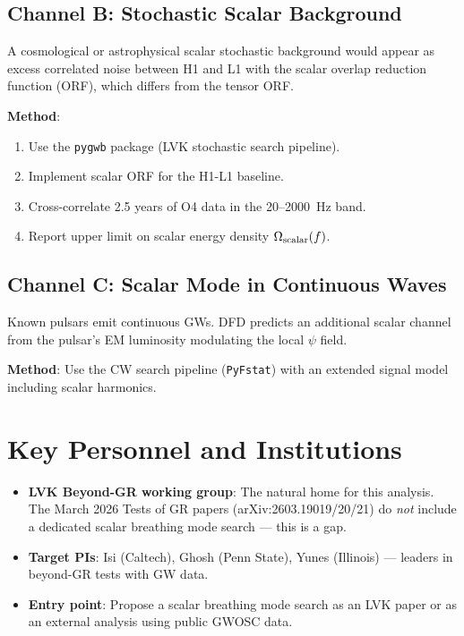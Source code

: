 \documentclass[11pt]{article}
\begin{document}
\subsection{Channel B: Stochastic Scalar Background}

A cosmological or astrophysical scalar stochastic background would
appear as excess correlated noise between H1 and L1 with the scalar
overlap reduction function (ORF), which differs from the tensor ORF.

\textbf{Method}:
\begin{enumerate}[nosep]
\item Use the \texttt{pygwb} package (LVK stochastic search pipeline).
\item Implement scalar ORF for the H1-L1 baseline.
\item Cross-correlate 2.5 years of O4 data in the 20--2000~Hz band.
\item Report upper limit on scalar energy density $\Omega_{\rm scalar}(f)$.
\end{enumerate}

\subsection{Channel C: Scalar Mode in Continuous Waves}

Known pulsars emit continuous GWs. DFD predicts an additional scalar
channel from the pulsar's EM luminosity modulating the local $\psi$ field.

\textbf{Method}: Use the CW search pipeline (\texttt{PyFstat}) with
an extended signal model including scalar harmonics.

\section{Key Personnel and Institutions}

\begin{itemize}[nosep]
\item \textbf{LVK Beyond-GR working group}: The natural home for this
  analysis. The March 2026 Tests of GR papers (arXiv:2603.19019/20/21)
  do \emph{not} include a dedicated scalar breathing mode search ---
  this is a gap.
\item \textbf{Target PIs}: Isi (Caltech), Ghosh (Penn State),
  Yunes (Illinois) --- leaders in beyond-GR tests with GW data.
\item \textbf{Entry point}: Propose a scalar breathing mode search
  as an LVK paper or as an external analysis using public GWOSC data.
\end{itemize}
\end{document}
